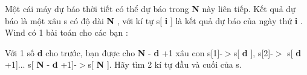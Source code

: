 Một cái máy dự báo thời tiết có thể dự báo trong   \textbf{    N   }   này liên tiếp. Kết quả dự báo là một xâu s có độ dài   \textbf{    N   }   , với kí tự s[   \textbf{    i   }   ] là kết quả dự báo của ngày thứ   \textbf{    i   }   . Wind có 1 bài toán cho các bạn :  

   Với 1 số   \textbf{    d   }   cho trước, bạn được cho   \textbf{    N   }   -   \textbf{    d   }   +1 xâu con s[1]-$>$s[   \textbf{    d   }   ], s[2]-$>$ s[   \textbf{    d   }   +1]... s[   \textbf{    N   }   -   \textbf{    d   }   +1]-$>$s[   \textbf{    N   }   ]. Hãy tìm 2 kí tự đầu và cuối của s.  

\